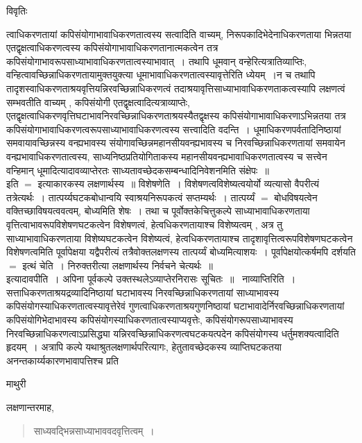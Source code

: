 \documentclass[10pt, openany]{book}
\begin{document}
{\newpage
\begin{center}     विवृतिः \end{center}
त्वाधिकरणतायां कपिसंयोगाभावाधिकरणतात्वस्य सत्वादिति वाच्यम्, निरूपकादिभेदेनाधिकरणताया भिन्नतया एतद्वृक्षत्वाधिकरणत्वस्य कपिसंयोगाभावाधिकरणतानात्मकत्वेन तत्र कपिसंयोगाभावरूपसाध्याभावाधिकरणतात्वस्याभावात्~। तथापि धूमवान् वन्हेरित्यत्रातिव्याप्तिः, वन्हित्वावच्छिन्नाधिकरणतायामुक्तयुक्त्या धूमाभावाधिकरणतात्वस्यावृत्तेरिति ध्येयम्~।न च तथापि तादृशस्वाधिकरणताश्रयवृत्तियन्निरवच्छिन्नाधिकरणत्वं
तदाश्रयावृत्तिसाध्याभावाधिकरणताकत्वस्यापि लक्षणत्वं सम्भवतीति वाच्यम् , कपिसंयोगी एतद्वृक्षत्वादित्यत्राव्याप्तेः, एतद्वृक्षत्वाधिकरणवृत्तिघटाभावनिरवच्छिन्नाधिकरणताश्रयस्यैतद्वृक्षस्य कपिसंयोगाभावाधिकरणाऽभिन्नतया तत्र कपिसंयोगाभावाधिकरणत्वरूपसाध्याभावाधिकरणत्वस्य सत्त्वादिति वदन्ति~। धूमाधिकरणपर्वतादिनिष्ठायां समवायावच्छिन्नस्य वन्ह्यभावस्य संयोगावच्छिन्नमहानसीयवन्ह्यभावस्य च निरवच्छिन्नाधिकरणतायां समवायेन वन्ह्यभावाधिकरणतात्वस्य, साध्यनिष्ठप्रतियोगिताकस्य महानसीयवन्ह्यभावाधिकरणतात्वस्य च सत्त्वेन वन्हिमान् धूमादित्यादावव्याप्तेरतः साध्यतावच्छेदकसम्बन्धादिनिवेशनमिति संक्षेपः~॥\\

इति $=$ इत्याकारकस्य लक्षणार्थस्य~॥ विशेषणेति~। विशेषणत्वविशेष्यत्वयोर्यो व्यत्यासो वैपरीत्यं तत्रेत्यर्थः~। तात्पर्य्यघटकबोधान्वयि स्वाश्रयनिरूपकत्वं सप्तम्यर्थः~। तात्पर्य्यं $=$ बोधविषयत्वेन वक्तिच्छाविषयत्ववत्वम्, बोध्यमिति शेषः~। तथा च पूर्वोक्तकेचित्तुकल्पे साध्याभावाधिकरणताया वृत्तित्वाभावरूपविशेषणघटकत्वेन विशेषणत्वं, हेत्वधिकरणतायाश्च विशेष्यत्वम् , अत्र तु साध्याभावाधिकरणताया विशेष्यघटकत्वेन विशेष्यत्वं, हेत्वधिकरणतायाश्च तादृशावृत्तित्वरूपविशेषणघटकत्वेन विशेषणत्वमिति पूर्वापेक्षया यद्वैपरीत्यं तत्रैवोक्तलक्षणस्य तात्पर्य्यं बोध्यमित्याशयः~। पूर्वापेक्षयोत्कर्षमपि दर्शयति $=$ {\la इत्थं चेति~।} निरुक्तरीत्या लक्षणार्थस्य निर्वचने चेत्यर्थः~॥\\

{\qt इत्यादावपीति~}। अपिना पूर्वकल्पे {\qt उक्तस्थलेऽव्याप्तेरनिरासः सूचितः~}॥~ {\la नाव्याप्तिरिति~।} सत्ताधिकरणताश्रयद्रव्यादिनिष्ठायां घटाभावस्य निरवच्छिन्नाधिकरणतायां साध्याभावस्य कपिसंयोगस्याधिकरणतात्वस्यावृत्तेरेवं गुणत्वाधिकरणताश्रयगुणनिष्ठायां घटाभावादेर्निरवच्छिन्नाधिकरणतायां कपिसंयोगिभेदाभावस्य कपिसंयोगस्याधिकरणतात्वस्याप्यवृत्तेः, कपिसंयोगरूपसाध्याभावस्य निरवच्छिन्नाधिकरणत्वाऽप्रसिद्ध्या यन्निरवच्छिन्नाधिकरणत्वघटकयत्पदेन कपिसंयोगस्य धर्तुमशक्यत्वादिति हृदयम्~। अत्रापि कल्पे यथाश्रुतलक्षणार्थपरित्यागः, हेतुतावच्छेदकस्य व्याप्तिघटकतया अनन्तकार्य्यकारणभावापत्तिश्च
प्रति
\newpage
\begin{center}  माथुरी  \end{center}
{\la लक्षणान्तरमाह,\textemdash\ 
\begin{quote}
\vpc
साध्यवद्भिन्नसाध्याभाववदवृत्तित्वम्~।~
    \end{quote}

}}
\end{document}
